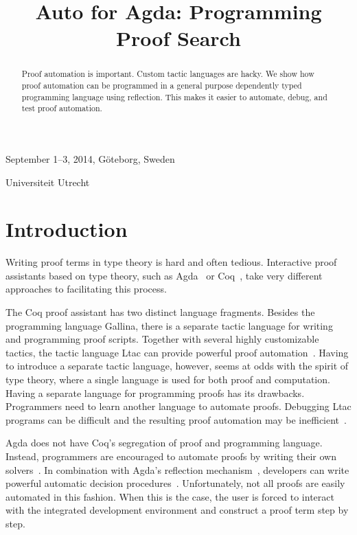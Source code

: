 \documentclass[preprint]{sigplanconf}
\begin{document}
 {September 1--3, 2014, G\"oteborg, Sweden}

\title{Auto for Agda: Programming Proof Search}

           {Universiteit Utrecht}
           {}
\maketitle



\begin{abstract}
Proof automation is important. Custom tactic languages are hacky. We
show how proof automation can be programmed in a general purpose
dependently typed programming language using reflection. This makes
it easier to automate, debug, and test proof automation.
\end{abstract}



\section{Introduction}
\label{sec:intro}

Writing proof terms in type theory is hard and often tedious.
Interactive proof assistants based on type theory, such as
Agda~\cite{agda} or Coq~\cite{coq}, take
very different approaches to facilitating this process.

The Coq proof assistant has two distinct language fragments. Besides the
programming language Gallina, there is a separate tactic language for
writing and programming proof scripts. Together with several highly
customizable tactics, the tactic language Ltac can provide powerful
proof automation~\cite{chlipala}. Having to introduce a
separate tactic language, however, seems at odds with the spirit of type
theory, where a single language is used for both proof and computation.
Having a separate language for programming proofs has its
drawbacks. Programmers need to learn another language to automate
proofs. Debugging Ltac programs can be difficult and the resulting
proof automation may be inefficient~\cite{brabaint}.


Agda does not have Coq's segregation of proof and programming language.
Instead, programmers are encouraged to automate proofs by writing their
own solvers~\cite{ulf-tphols}. In combination with
Agda's reflection mechanism~\cite{van-der-walt},
developers can write powerful automatic decision
procedures~\cite{allais}. Unfortunately, not all proofs
are easily automated in this fashion. When this is the case, the user is
forced to interact with the integrated development environment and
construct a proof term step by step.
\end{document}
